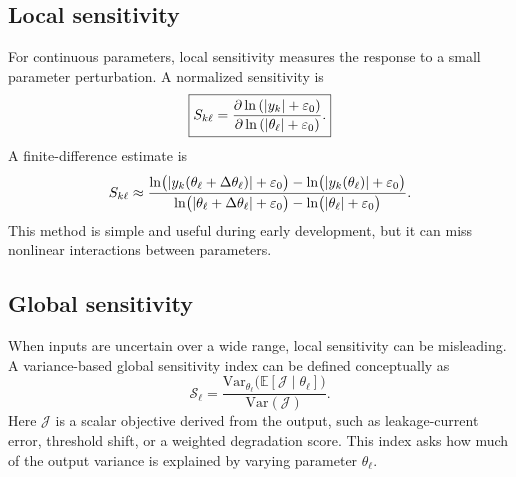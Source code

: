 \documentclass[11pt]{article}
\begin{document}
\subsection{Local sensitivity}
For continuous parameters, local sensitivity measures the response to a small parameter perturbation. A normalized sensitivity is
\begin{equation}
    \boxed{
    S_{k\ell}
    =
    \frac{\partial \ln\left(\abs{y_k}+\varepsilon_0\right)}
    {\partial \ln\left(\abs{\theta_\ell}+\varepsilon_0\right)}.
    }
    \label{eq:normalized_local_sensitivity}
\end{equation}
A finite-difference estimate is
\begin{equation}
    S_{k\ell}
    \approx
    \frac{\ln\!\big(\abs{y_k(\theta_\ell+\Delta\theta_\ell)}+\varepsilon_0\big)
          -\ln\!\big(\abs{y_k(\theta_\ell)}+\varepsilon_0\big)}
    {\ln\!\big(\abs{\theta_\ell+\Delta\theta_\ell}+\varepsilon_0\big)
          -\ln\!\big(\abs{\theta_\ell}+\varepsilon_0\big)}.
    \label{eq:finite_difference_sensitivity}
\end{equation}
This method is simple and useful during early development, but it can miss nonlinear interactions between parameters.

\subsection{Global sensitivity}
When inputs are uncertain over a wide range, local sensitivity can be misleading. A variance-based global sensitivity index can be defined conceptually as
\begin{equation}
    \boxed{
    \mathcal{S}_\ell
    =
    \frac{\mathrm{Var}_{\theta_\ell}\!\big(\mathbb{E}[\mathcal{J}\mid \theta_\ell]\big)}
    {\mathrm{Var}(\mathcal{J})}.
    }
    \label{eq:global_sensitivity}
\end{equation}
Here \(\mathcal{J}\) is a scalar objective derived from the output, such as leakage-current error, threshold shift, or a weighted degradation score. This index asks how much of the output variance is explained by varying parameter \(\theta_\ell\).
\end{document}
